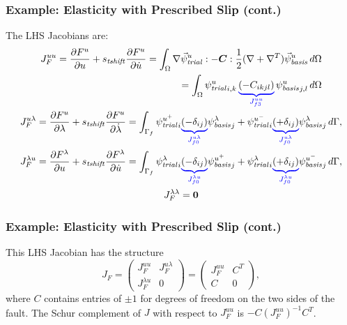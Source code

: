 \documentclass[aspectratio=169]{beamer}
\begin{document}
\begin{frame}
  \frametitle{Example: Elasticity with Prescribed Slip (cont.)}
  \summary{}

  The LHS Jacobians are:
\begin{gather}
  \begin{split}
  J_F^{uu} = \frac{\partial F^u}{\partial u} + s_\mathit{tshift} \frac{\partial F^u}{\partial \dot{u}}
      = \int_\Omega \nabla \trialvec[u] : -\tensor{C} : \frac{1}{2}(\nabla + \nabla^T)\basisvec[u] 
\, d\Omega \\
= \int_\Omega \trialscalar[u]_{i,k} \, \eqnannotate{\left( -C_{ikjl} \right)}{J_{f3}^{uu}} \, \basisscalar[u]_{j,l}\, d\Omega
\end{split}\\
  J_F^{u\lambda} = \frac{\partial F^u}{\partial \lambda} + s_\mathit{tshift} \frac{\partial F^u}{\partial \dot{\lambda}}
      = \int_{\Gamma_{f}} \trialscalar[u^+]_i \eqnannotate{\left(-\delta_{ij}\right)}{J^{u\lambda}_{f0}} \basisscalar[\lambda]_j
                   + \trialscalar[u^-]_i \eqnannotate{\left(+\delta_{ij}\right)}{J^{u\lambda}_{f0}} \basisscalar[\lambda]_j\, d\Gamma, \\
  J_F^{\lambda u} = \frac{\partial F^\lambda}{\partial u} + s_\mathit{tshift} \frac{\partial F^\lambda}{\partial \dot{u}}
      = \int_{\Gamma_{f}} \trialscalar[\lambda]_i 
                    \eqnannotate{\left(-\delta_{ij}\right)}{J^{\lambda u}_{f0}} \basisscalar[u^+]_j
                    + \trialscalar[\lambda]_i \eqnannotate{\left(+\delta_{ij}\right)}{J^{\lambda u}_{f0}} \basisscalar[u^-]_j \, d\Gamma, \\
  J_F^{\lambda \lambda} = \tensor{0}
\end{gather}

\end{frame}


\begin{frame}
  \frametitle{Example: Elasticity with Prescribed Slip (cont.)}
  \summary{}

  This LHS Jacobian has the structure
  \begin{equation}
    J_F = \left( \begin{array} {cc} J_F^{uu} & J_F^{u\lambda} \\ J_F^{\lambda u} & 0 \end{array} \right)
    = \left( \begin{array} {cc} J_F^{uu} & C^T \\ C & 0 \end{array} \right),
  \end{equation}
  where $C$ contains entries of $\pm 1$ for degrees of freedom on the two sides of the fault.
  The Schur complement of $J$ with respect to $J_F^{uu}$ is $-C\left(J_F^{uu}\right)^{-1}C^T$.

\end{frame}
\end{document}

